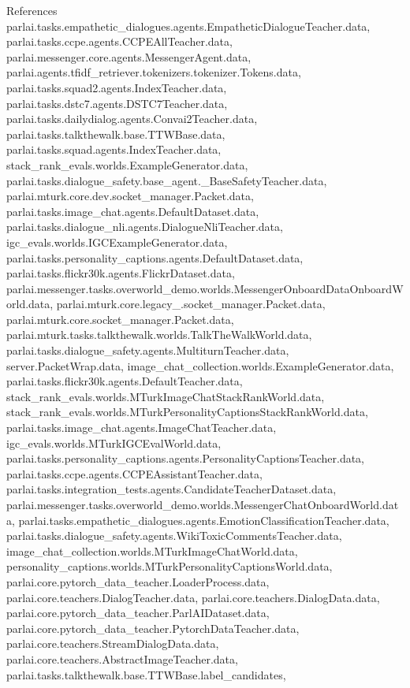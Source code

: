 References parlai.\+tasks.\+empathetic\+\_\+dialogues.\+agents.\+Empathetic\+Dialogue\+Teacher.\+data, parlai.\+tasks.\+ccpe.\+agents.\+C\+C\+P\+E\+All\+Teacher.\+data, parlai.\+messenger.\+core.\+agents.\+Messenger\+Agent.\+data, parlai.\+agents.\+tfidf\+\_\+retriever.\+tokenizers.\+tokenizer.\+Tokens.\+data, parlai.\+tasks.\+squad2.\+agents.\+Index\+Teacher.\+data, parlai.\+tasks.\+dstc7.\+agents.\+D\+S\+T\+C7\+Teacher.\+data, parlai.\+tasks.\+dailydialog.\+agents.\+Convai2\+Teacher.\+data, parlai.\+tasks.\+talkthewalk.\+base.\+T\+T\+W\+Base.\+data, parlai.\+tasks.\+squad.\+agents.\+Index\+Teacher.\+data, stack\+\_\+rank\+\_\+evals.\+worlds.\+Example\+Generator.\+data, parlai.\+tasks.\+dialogue\+\_\+safety.\+base\+\_\+agent.\+\_\+\+Base\+Safety\+Teacher.\+data, parlai.\+mturk.\+core.\+dev.\+socket\+\_\+manager.\+Packet.\+data, parlai.\+tasks.\+image\+\_\+chat.\+agents.\+Default\+Dataset.\+data, parlai.\+tasks.\+dialogue\+\_\+nli.\+agents.\+Dialogue\+Nli\+Teacher.\+data, igc\+\_\+evals.\+worlds.\+I\+G\+C\+Example\+Generator.\+data, parlai.\+tasks.\+personality\+\_\+captions.\+agents.\+Default\+Dataset.\+data, parlai.\+tasks.\+flickr30k.\+agents.\+Flickr\+Dataset.\+data, parlai.\+messenger.\+tasks.\+overworld\+\_\+demo.\+worlds.\+Messenger\+Onboard\+Data\+Onboard\+World.\+data, parlai.\+mturk.\+core.\+legacy\+\_.\+socket\+\_\+manager.\+Packet.\+data, parlai.\+mturk.\+core.\+socket\+\_\+manager.\+Packet.\+data, parlai.\+mturk.\+tasks.\+talkthewalk.\+worlds.\+Talk\+The\+Walk\+World.\+data, parlai.\+tasks.\+dialogue\+\_\+safety.\+agents.\+Multiturn\+Teacher.\+data, server.\+Packet\+Wrap.\+data, image\+\_\+chat\+\_\+collection.\+worlds.\+Example\+Generator.\+data, parlai.\+tasks.\+flickr30k.\+agents.\+Default\+Teacher.\+data, stack\+\_\+rank\+\_\+evals.\+worlds.\+M\+Turk\+Image\+Chat\+Stack\+Rank\+World.\+data, stack\+\_\+rank\+\_\+evals.\+worlds.\+M\+Turk\+Personality\+Captions\+Stack\+Rank\+World.\+data, parlai.\+tasks.\+image\+\_\+chat.\+agents.\+Image\+Chat\+Teacher.\+data, igc\+\_\+evals.\+worlds.\+M\+Turk\+I\+G\+C\+Eval\+World.\+data, parlai.\+tasks.\+personality\+\_\+captions.\+agents.\+Personality\+Captions\+Teacher.\+data, parlai.\+tasks.\+ccpe.\+agents.\+C\+C\+P\+E\+Assistant\+Teacher.\+data, parlai.\+tasks.\+integration\+\_\+tests.\+agents.\+Candidate\+Teacher\+Dataset.\+data, parlai.\+messenger.\+tasks.\+overworld\+\_\+demo.\+worlds.\+Messenger\+Chat\+Onboard\+World.\+data, parlai.\+tasks.\+empathetic\+\_\+dialogues.\+agents.\+Emotion\+Classification\+Teacher.\+data, parlai.\+tasks.\+dialogue\+\_\+safety.\+agents.\+Wiki\+Toxic\+Comments\+Teacher.\+data, image\+\_\+chat\+\_\+collection.\+worlds.\+M\+Turk\+Image\+Chat\+World.\+data, personality\+\_\+captions.\+worlds.\+M\+Turk\+Personality\+Captions\+World.\+data, parlai.\+core.\+pytorch\+\_\+data\+\_\+teacher.\+Loader\+Process.\+data, parlai.\+core.\+teachers.\+Dialog\+Teacher.\+data, parlai.\+core.\+teachers.\+Dialog\+Data.\+data, parlai.\+core.\+pytorch\+\_\+data\+\_\+teacher.\+Parl\+A\+I\+Dataset.\+data, parlai.\+core.\+pytorch\+\_\+data\+\_\+teacher.\+Pytorch\+Data\+Teacher.\+data, parlai.\+core.\+teachers.\+Stream\+Dialog\+Data.\+data, parlai.\+core.\+teachers.\+Abstract\+Image\+Teacher.\+data, parlai.\+tasks.\+talkthewalk.\+base.\+T\+T\+W\+Base.\+label\+\_\+candidates, 